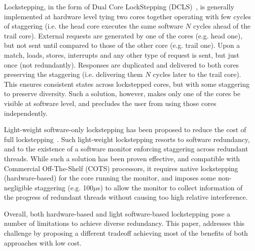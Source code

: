 Lockstepping, in the form of Dual Core LockStepping (DCLS)~\cite{infineon_aurix,STlockstep,RendundancyASILD}, is generally implemented at hardware level tying two cores together operating with few cycles of staggering (i.e. the head core executes the same software $N$ cycles ahead of the trail core). External requests are generated by one of the cores (e.g. head one), but not sent until compared to those of the other core (e.g. trail one). Upon a match, loads, stores, interrupts and any other type of request is sent, but just once (not redundantly). Responses are duplicated and delivered to both cores preserving the staggering (i.e. delivering them $N$ cycles later to the trail core). This ensures consistent states across lockstepped cores, but with some staggering to preserve diversity. Such a solution, however, makes only one of the cores be visible at software level, and precludes the user from using those cores independently.

Light-weight software-only lockstepping has been proposed to reduce the cost of full lockstepping~\cite{SergiDFT}. Such light-weight lockstepping resorts to software redundancy, and to the existence of a software monitor enforcing staggering across redundant threads. While such a solution has been proven effective, and compatible with Commercial Off-The-Shelf (COTS) processors, it requires native lockstepping (hardware-based) for the core running the monitor, and imposes some non-negligible staggering (e.g. 100$\mu$s) to allow the monitor to collect information of the progress of redundant threads without causing too high relative interference.

Overall, both hardware-based and light software-based lockstepping pose a number of limitations to achieve diverse redundancy. This paper, addresses this challenge by proposing a different tradeoff achieving most of the benefits of both approaches with low cost.

